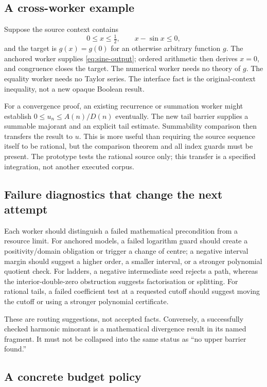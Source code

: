 \documentclass[11pt,a4paper]{article}
\theoremstyle{definition}\newtheorem{definition}[theorem]{Definition}
\begin{document}
\subsection{A cross-worker example}

Suppose the source context contains
\[
 0\le x\le\tfrac12,\qquad x-\sin x\le0,
\]
and the target is $g(x)=g(0)$ for an otherwise arbitrary function $g$.
The anchored worker supplies \eqref{eq:sine-output}; ordered arithmetic then
derives $x=0$, and congruence closes the target. The numerical worker needs no
theory of $g$. The equality worker needs no Taylor series. The interface fact
is the original-context inequality, not a new opaque Boolean result.

For a convergence proof, an existing recurrence or summation worker might
establish $0\le u_n\le A(n)/D(n)$ eventually. The new tail barrier supplies a
summable majorant and an explicit tail estimate. Summability comparison then
transfers the result to $u$. This is more useful than requiring the source
sequence itself to be rational, but the comparison theorem and all index guards
must be present. The prototype tests the rational source only; this transfer is
a specified integration, not another executed corpus.

\subsection{Failure diagnostics that change the next attempt}

Each worker should distinguish a failed mathematical precondition from a
resource limit. For anchored models, a failed logarithm guard should create a
positivity/domain obligation or trigger a change of centre; a negative interval
margin should suggest a higher order, a smaller interval, or a stronger
polynomial quotient check. For ladders, a negative intermediate seed rejects a
path, whereas the interior-double-zero obstruction suggests factorisation or
splitting. For rational tails, a failed coefficient test at a requested cutoff
should suggest moving the cutoff or using a stronger polynomial certificate.

These are routing suggestions, not accepted facts. Conversely, a successfully
checked harmonic minorant is a mathematical divergence result in its named
fragment. It must not be collapsed into the same status as ``no upper barrier
found.''

\subsection{A concrete budget policy}
\end{document}

